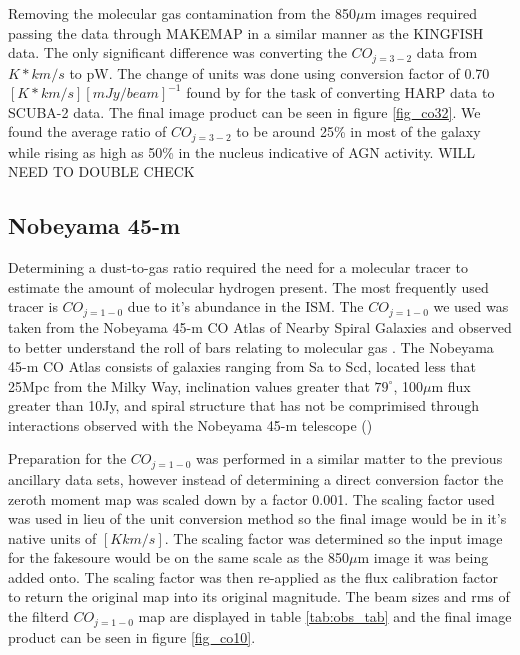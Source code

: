 \begin{table}[h]
Removing the molecular gas contamination from the 850$\mu$m images required passing the data through MAKEMAP in a similar manner as the KINGFISH data.  The only significant difference was converting the $CO_{j=3-2}$ data from $K*km/s$ to pW.  The change of units was done using conversion factor of 0.70 $[K*km/s][mJy/beam]^{-1}$ found by \citet{drabek2012} for the task of converting HARP data to SCUBA-2 data.  The final image product can be seen in figure \ref{fig_co32}.  We found the average ratio of $CO_{j=3-2}$ to be around 25\% in most of the galaxy while rising as high as 50\% in the nucleus indicative of AGN activity.  WILL NEED TO DOUBLE CHECK


\subsection{Nobeyama 45-m}

Determining a dust-to-gas ratio required the need for a molecular tracer to estimate the amount of molecular hydrogen present.  The most frequently used tracer is $CO_{j=1-0}$ due to it's abundance in the ISM.  The $CO_{j=1-0}$ we used was taken from the Nobeyama 45-m CO Atlas of Nearby Spiral Galaxies and observed to better understand the roll of bars relating to molecular gas \citet{kuno2007}.  The Nobeyama 45-m CO Atlas consists of galaxies ranging from Sa to Scd, located less that 25Mpc from the Milky Way, inclination values greater that $79^{\circ}$, 100$\mu$m flux greater than 10Jy, and spiral structure that has not be comprimised through interactions observed with the Nobeyama 45-m telescope (\citet{kuno2007})

Preparation for the $CO_{j=1-0}$ was performed in a similar matter to the previous ancillary data sets, however instead of determining a direct conversion factor the zeroth moment map was scaled down by a factor 0.001.  The scaling factor used was used in lieu of the unit conversion method so the final image would be in it's native units of $[K km/s]$.  The scaling factor was determined so the input image for the fakesoure would be on the same scale as the 850$\mu$m image it was being added onto.  The scaling factor was then re-applied as the flux calibration factor to return the original map into its original magnitude.  The beam sizes and rms of the filterd $CO_{j=1-0}$ map are displayed in table \ref{tab:obs_tab} and the final image product can be seen in figure \ref{fig_co10}.



\end{table}
